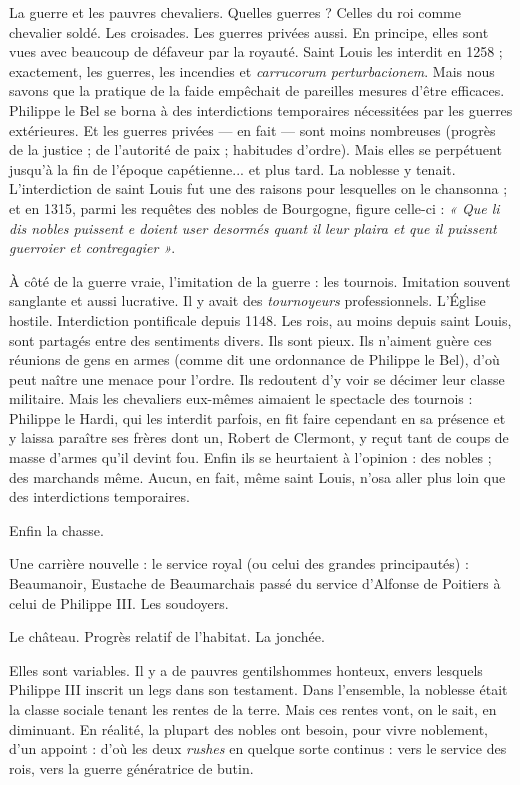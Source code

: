\documentclass[french,twoside]{book} %
\newcommand{\labelchar}[1]{{\color{rubric}\bf #1}}
\newcommand\chapterclose{} %
\begin{document}
\noindent La guerre et les pauvres chevaliers. Quelles guerres ? Celles du roi comme chevalier soldé. Les croisades. Les guerres privées aussi. En principe, elles sont vues avec beaucoup de défaveur par la royauté. Saint Louis les interdit en 1258 ; exactement, les guerres, les incendies et \emph{carrucorum perturbacionem}. Mais nous savons que la pratique de la faide empêchait de pareilles mesures d’être efficaces. Philippe le Bel se borna à des interdictions temporaires nécessitées par les guerres extérieures. Et les guerres privées — en fait — sont moins nombreuses (progrès de la justice ; de l’autorité de paix ; habitudes d’ordre). Mais elles se perpétuent jusqu’à la fin de l’époque capétienne... et plus tard. La noblesse y tenait. L’interdiction de saint Louis fut une des raisons pour lesquelles on le chansonna ; et en 1315, parmi les requêtes des nobles de Bourgogne, figure celle-ci : \emph{« Que li dis nobles puissent e doient user desormés quant il leur plaira et que il puissent guerroier et contregagier »}.\par
À côté de la guerre vraie, l’imitation de la guerre : les tournois. Imitation souvent sanglante et aussi lucrative. Il y avait des \emph{tournoyeurs} professionnels. L’Église hostile. Interdiction pontificale depuis 1148. Les rois, au moins depuis saint Louis, sont partagés entre des sentiments divers. Ils sont pieux. Ils n’aiment guère ces réunions de gens en armes (comme dit une ordonnance de Philippe le Bel), d’où peut naître une menace pour l’ordre. Ils redoutent d’y voir se décimer leur classe militaire. Mais les chevaliers eux-mêmes aimaient le spectacle des tournois : Philippe le Hardi, qui les interdit parfois, en fit faire cependant en sa présence et y laissa paraître ses frères dont un, Robert de Clermont, y reçut tant de coups de masse d’armes qu’il devint fou. Enfin ils se heurtaient à l’opinion : des nobles ; des marchands même. Aucun, en fait, même saint Louis, n’osa aller plus loin que des interdictions temporaires.\par
Enfin la chasse.\par
Une carrière nouvelle : le service royal (ou celui des grandes principautés) : Beaumanoir, Eustache de Beaumarchais passé du service d’Alfonse de Poitiers à celui de Philippe III. Les soudoyers.\par
Le château. Progrès relatif de l’habitat. La jonchée.\par
\bigbreak
\noindent \labelchar{d) Les fortunes nobiliaires.}\par
Elles sont variables. Il y a de pauvres gentilshommes honteux, envers lesquels Philippe III inscrit un legs dans son testament. Dans l’ensemble, la noblesse était la classe sociale tenant les rentes de la terre. Mais ces rentes vont, on le sait, en diminuant. En réalité, la plupart des nobles ont besoin, pour vivre noblement, d’un appoint : d’où les deux {\itshape rushes} en quelque sorte continus : vers le service des rois, vers la guerre génératrice de butin.
\chapterclose
\end{document}
